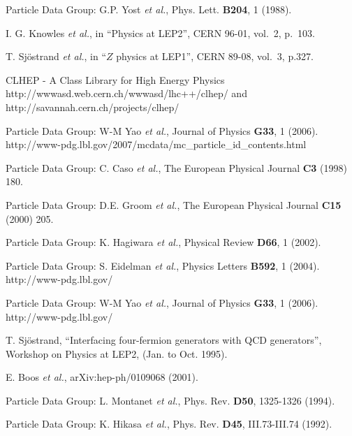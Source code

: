 
\def\etal{{\it et al.}}

\begin{thebibliography}{9}

Particle Data Group: G.P. Yost \etal, Phys. Lett. {\bf B204}, 1 (1988).

I. G. Knowles \etal, in ``Physics at LEP2'', CERN 96-01, vol.~2, p.~103.

T. Sj\"ostrand \etal, in ``$Z$ physics at LEP1'', CERN 89-08, vol.~3, p.327.

CLHEP - A Class Library for High Energy Physics
http://wwwasd.web.cern.ch/wwwasd/lhc++/clhep/ and 
http://savannah.cern.ch/projects/clhep/

Particle Data Group: W-M Yao \etal, Journal of Physics {\bf G33}, 1 (2006).
http://www-pdg.lbl.gov/2007/mcdata/mc\_particle\_id\_contents.html

Particle Data Group: C. Caso \etal, The European Physical Journal {\bf C3} (1998) 180. 

Particle Data Group: D.E. Groom \etal, The European Physical Journal {\bf C15} (2000) 205. 

Particle Data Group: K. Hagiwara \etal, Physical Review {\bf D66}, 1 (2002). 

Particle Data Group: S. Eidelman \etal, Physics Letters {\bf B592}, 1 (2004).
http://www-pdg.lbl.gov/ 

Particle Data Group: W-M Yao \etal, Journal of Physics {\bf G33}, 1 (2006).
http://www-pdg.lbl.gov/ 

T. Sj\"ostrand, ``Interfacing four-fermion generators with  QCD generators'', 
Workshop on Physics at LEP2, (Jan. to Oct. 1995).

E. Boos \etal, arXiv:hep-ph/0109068 (2001).

Particle Data Group: L. Montanet \etal, Phys. Rev. {\bf D50}, 1325-1326 (1994).

Particle Data Group: K. Hikasa \etal, Phys. Rev. {\bf D45}, III.73-III.74 (1992).

\end{thebibliography}
\newpage

